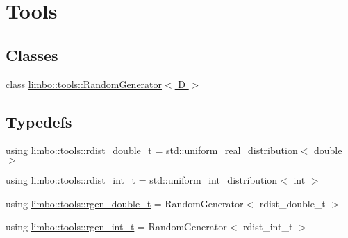 \hypertarget{group__tools}{}\section{Tools}
\label{group__tools}
\subsection*{Classes}
\begin{DoxyCompactItemize}
\item 
class \hyperlink{classlimbo_1_1tools_1_1_random_generator}{limbo\+::tools\+::\+Random\+Generator$<$ D $>$}
\end{DoxyCompactItemize}
\subsection*{Typedefs}
\begin{DoxyCompactItemize}
\item 
using \hyperlink{group__tools_gab2609bfef1e3bdb8b44c0d6c8c139927}{limbo\+::tools\+::rdist\+\_\+double\+\_\+t} = std\+::uniform\+\_\+real\+\_\+distribution$<$ double $>$
\item 
using \hyperlink{group__tools_gacb322b4600b2e500dbcd24661a749f49}{limbo\+::tools\+::rdist\+\_\+int\+\_\+t} = std\+::uniform\+\_\+int\+\_\+distribution$<$ int $>$
\item 
using \hyperlink{group__tools_gacdb2963659056fc5fa9f94405f59a851}{limbo\+::tools\+::rgen\+\_\+double\+\_\+t} = Random\+Generator$<$ rdist\+\_\+double\+\_\+t $>$
\item 
using \hyperlink{group__tools_ga3df78ebcb864be91e73e840bb42b9208}{limbo\+::tools\+::rgen\+\_\+int\+\_\+t} = Random\+Generator$<$ rdist\+\_\+int\+\_\+t $>$
\end{DoxyCompactItemize}
